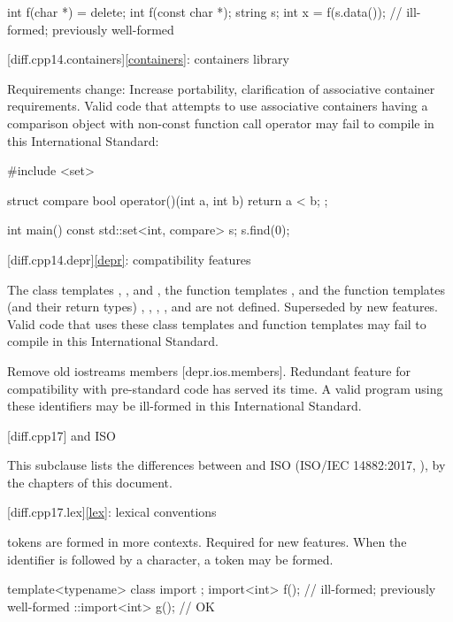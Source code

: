 \begin{codeblock}
int f(char *) = delete;
int f(const char *);
string s;
int x = f(s.data());            // ill-formed; previously well-formed
\end{codeblock}

[diff.cpp14.containers]{\ref{containers}: containers library}

\change
Requirements change:
\rationale
Increase portability, clarification of associative container requirements.
\effect
Valid \CppXIV{} code that attempts to use associative containers
having a comparison object with non-const function call operator
may fail to compile in this International Standard:
\begin{codeblock}
#include <set>

struct compare
{
  bool operator()(int a, int b)
  {
    return a < b;
  }
};

int main() {
  const std::set<int, compare> s;
  s.find(0);
}
\end{codeblock}

[diff.cpp14.depr]{\ref{depr}: compatibility features}

\nodiffref
\change
The class templates
,
, and
,
the function templates
,
and the function templates (and their return types)
,
,
,
, and
are not defined.
\rationale
Superseded by new features.
\effect
Valid \CppXIV{} code that uses these class templates
and function templates may fail to compile in this International Standard.

\nodiffref
\change
Remove old iostreams members [depr.ios.members].
\rationale
Redundant feature for compatibility with pre-standard code
has served its time.
\effect
A valid \CppXIV{} program using these identifiers
may be ill-formed in this International Standard.

[diff.cpp17]{\Cpp{} and ISO \CppXVII{}}

\pnum
{}%
This subclause lists the differences between \Cpp{} and
ISO \CppXVII{} (ISO/IEC 14882:2017, ),
by the chapters of this document.

[diff.cpp17.lex]{\ref{lex}: lexical conventions}

\change
{} tokens are formed in more contexts.
\rationale
Required for new features.
\effect
When the identifier 
is followed by a \tcode{<} character,
a  token may be formed.
\begin{example}
\begin{codeblock}
template<typename> class import {};
import<int> f();                // ill-formed; previously well-formed
::import<int> g();              // OK
\end{codeblock}
\end{example}

